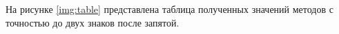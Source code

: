 На рисунке \ref{img:table} представлена таблица полученных значений методов с точностью до двух знаков после запятой.
\begin{figure}[H]
\end{figure} 

